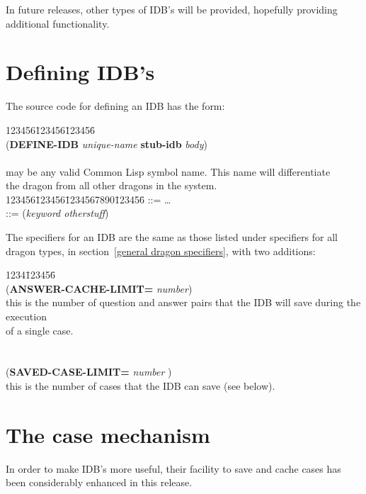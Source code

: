 In future releases, other types of IDB's will be provided, hopefully
providing additional functionality.

\section{Defining IDB's}

The source code for defining an IDB has the form:

\begin{tabbing}
123456\=123456\=123456\= \kill
\\
\>({\bf DEFINE-IDB} {\it unique-name} {\bf stub-idb} {\it body\/}) \\
\\
\> may be any valid Common Lisp symbol name.
This name will differentiate\\
\>\>\>the dragon from all other dragons in the system. \\
123456\=123456\=1234567890\=123456\= \kill
\> \>::=  \ldots \\
\> \>::= \>({\it keyword otherstuff\/})
\\
\end{tabbing}

The specifiers for an IDB are the same as those listed under
specifiers for all dragon types, in section~\ref{general dragon
specifiers}, with two additions:

\begin{tabbing}
1234\=123456\= \kill
\\
({\bf ANSWER-CACHE-LIMIT=} {\it number\/}) \\
\>\>this is the number of question and answer pairs that the IDB will save during the execution \\
\>\>of a single case. \\
\\
\\
({\bf SAVED-CASE-LIMIT=} {\it number \/}) \\
\>\>this is the number of cases that the IDB can save (see below). \\
\end{tabbing}

\section{The case mechanism}

In order to make IDB's more useful, their facility to save and cache
cases has been considerably enhanced in this release.

